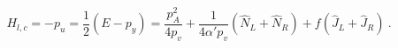\begin{equation}
 H_{l,c} = - p_u = \frac{1}{2}(E - p_y) 
  = \frac{p^2_A}{4 p_v}  + \frac{1}{4 \alpha ' p_v} (\hat N _L + \hat N _R) 
   +  f (\hat J_L + \hat J_R )~.
\label{spectrum2}
\end{equation}

